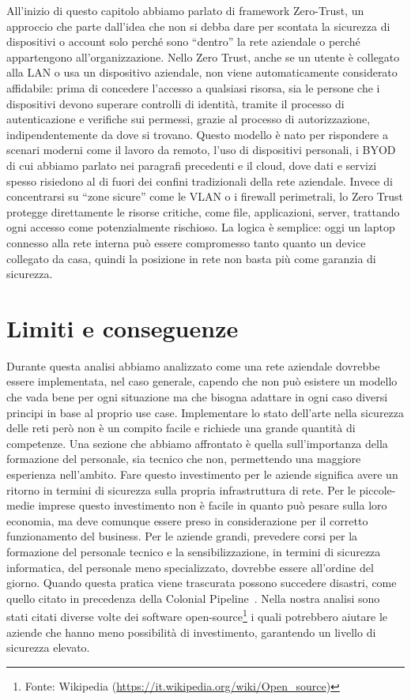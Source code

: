         All'inizio di questo capitolo abbiamo parlato di framework Zero-Trust, un approccio che parte dall'idea che non si debba dare per scontata la sicurezza di dispositivi o account solo perché sono “dentro” la rete aziendale o perché appartengono all'organizzazione. Nello Zero Trust, anche se un utente è collegato alla LAN o usa un dispositivo aziendale, non viene automaticamente considerato affidabile: prima di concedere l’accesso a qualsiasi risorsa, sia le persone che i dispositivi devono superare controlli di identità, tramite il processo di autenticazione e verifiche sui permessi, grazie al processo di autorizzazione, indipendentemente da dove si trovano.
        Questo modello è nato per rispondere a scenari moderni come il lavoro da remoto, l'uso di dispositivi personali, i BYOD di cui abbiamo parlato nei paragrafi precedenti e il cloud, dove dati e servizi spesso risiedono al di fuori dei confini tradizionali della rete aziendale. Invece di concentrarsi su “zone sicure” come le VLAN o i firewall perimetrali, lo Zero Trust protegge direttamente le risorse critiche, come file, applicazioni, server, trattando ogni accesso come potenzialmente rischioso. La logica è semplice: oggi un laptop connesso alla rete interna può essere compromesso tanto quanto un device collegato da casa, quindi la posizione in rete non basta più come garanzia di sicurezza.

        
    \section{Limiti e conseguenze}
        Durante questa analisi abbiamo analizzato come una rete aziendale dovrebbe essere implementata, nel caso generale, capendo che non può esistere un modello che vada bene per ogni situazione ma che bisogna adattare in ogni caso diversi principi in base al proprio use case.
        Implementare lo stato dell'arte nella sicurezza delle reti però non è un compito facile e richiede una grande quantità di competenze. Una sezione che abbiamo affrontato è quella sull'importanza della formazione del personale, sia tecnico che non, permettendo una maggiore esperienza nell'ambito. Fare questo investimento per le aziende significa avere un ritorno in termini di sicurezza sulla propria infrastruttura di rete. Per le piccole-medie imprese questo investimento non è facile in quanto può pesare sulla loro economia, ma deve comunque essere preso in considerazione per il corretto funzionamento del business.
        \newpage
        Per le aziende grandi, prevedere corsi per la formazione del personale tecnico e la sensibilizzazione, in termini di sicurezza informatica, del personale meno specializzato, dovrebbe essere all'ordine del giorno. Quando questa pratica viene trascurata possono succedere disastri, come quello citato in precedenza della Colonial Pipeline~\cite{colonial_pipeline_attack}.
        Nella nostra analisi sono stati citati diverse volte dei software open-source\footnote{Fonte: Wikipedia (\url{https://it.wikipedia.org/wiki/Open_source})} i quali potrebbero aiutare le aziende che hanno meno possibilità di investimento, garantendo un livello di sicurezza elevato.

